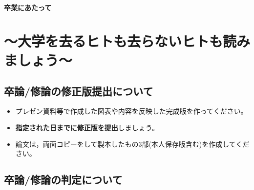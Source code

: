 \documentclass[11pt, ]{jsarticle}
\providecommand{\tightlist}{%
   \setlength{\itemsep}{0pt}\setlength{\parskip}{0pt}}
\begin{document}
\renewcommand{\lstlistingname}{リスト}


\noindent
\begin{center}
  \textbf{\LARGE 卒業にあたって}
\end{center}
  

\hypertarget{ux5927ux5b66ux3092ux53bbux308bux30d2ux30c8ux3082ux53bbux3089ux306aux3044ux30d2ux30c8ux3082ux8aadux307fux307eux3057ux3087ux3046}{%
\section{〜大学を去るヒトも去らないヒトも読みましょう〜}\label{ux5927ux5b66ux3092ux53bbux308bux30d2ux30c8ux3082ux53bbux3089ux306aux3044ux30d2ux30c8ux3082ux8aadux307fux307eux3057ux3087ux3046}}

\hypertarget{ux5352ux8ad6ux4feeux8ad6ux306eux4feeux6b63ux7248ux63d0ux51faux306bux3064ux3044ux3066}{%
\subsection{卒論/修論の修正版提出について}\label{ux5352ux8ad6ux4feeux8ad6ux306eux4feeux6b63ux7248ux63d0ux51faux306bux3064ux3044ux3066}}

\begin{itemize}
\tightlist
\item
  プレゼン資料等で作成した図表や内容を反映した完成版を作ってください。
\item
  \textbf{指定された日までに修正版を提出}しましょう。
\item
  論文は，両面コピーをして製本したもの3部(本人保存版含む)を作成してください。
\end{itemize}

\hypertarget{ux5352ux8ad6ux4feeux8ad6ux306eux5224ux5b9aux306bux3064ux3044ux3066}{%
\subsection{卒論/修論の判定について}\label{ux5352ux8ad6ux4feeux8ad6ux306eux5224ux5b9aux306bux3064ux3044ux3066}}
\end{document}
